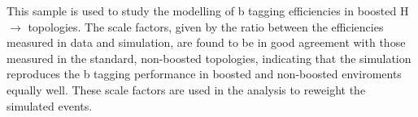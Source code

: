This sample is used to study the modelling of b tagging efficiencies in boosted H $\to$ \bbbar topologies.
The scale factors, given by the ratio between the efficiencies measured in data and simulation, are
found to be in good agreement with those measured in the standard, non-boosted topologies,
indicating that the simulation reproduces the b tagging performance in boosted and non-boosted enviroments equally well.
These scale factors are used in the analysis to reweight the simulated events.

